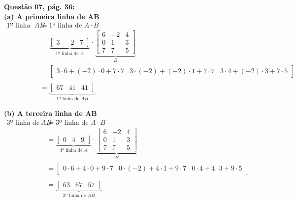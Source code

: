 \documentclass[a4paper,12pt]{article}
\begin{document}
\textbf{Questão 07, pág. 36:} \\
\textbf{(a) A primeira linha de AB}
\begin{align*}
    \text{1º linha de } AB &= \text{1º linha de }A \cdot B\\
    &=
    \underbrace{
    \begin{bmatrix}
        3 & -2 & 7
    \end{bmatrix}}_{\text{1º linha de }A}
    \cdot
    \underbrace{
    \begin{bmatrix}
        6 & -2 & 4 \\
        0 & 1 & 3 \\
        7 & 7 & 5
    \end{bmatrix}}_{B} \\
    &=
    \begin{bmatrix}
        3 \cdot 6    + (-2) \cdot 0 + 7 \cdot 7 &
        3 \cdot (-2) + (-2) \cdot 1 + 7 \cdot 7 &
        3 \cdot 4    + (-2) \cdot 3 + 7 \cdot 5
    \end{bmatrix}\\ \\
    &=
    \underbrace{
    \begin{bmatrix}
        67 & 41 & 41
    \end{bmatrix}}_{\text{1º linha de }AB}
\end{align*}

\textbf{(b) A terceira linha de AB}
\begin{align*}
    \text{3º linha de } AB &= \text{3º linha de }A \cdot B\\
    &=
    \underbrace{
    \begin{bmatrix}
        0 & 4 & 9
    \end{bmatrix}}_{\text{3º linha de }A}
    \cdot
    \underbrace{
    \begin{bmatrix}
        6 & -2 & 4 \\
        0 & 1 & 3 \\
        7 & 7 & 5
    \end{bmatrix}}_{B} \\
    &=
    \begin{bmatrix}
        0 \cdot 6    + 4 \cdot 0 + 9 \cdot 7 &
        0 \cdot (-2) + 4 \cdot 1 + 9 \cdot 7 &
        0 \cdot 4    + 4 \cdot 3 + 9 \cdot 5
    \end{bmatrix}\\ \\
    &=
    \underbrace{
    \begin{bmatrix}
        63 & 67 & 57
    \end{bmatrix}}_{\text{3º linha de }AB}
\end{align*}
\end{document}
